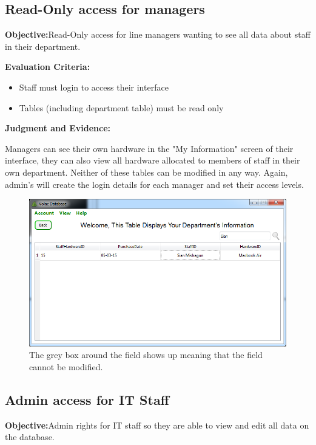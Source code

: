\subsection{Read-Only access for managers}

\textbf{Objective:}Read-Only access for line managers wanting to see all data about staff in their department.

\textbf{Evaluation Criteria:}
\begin{itemize}
\item{Staff must login to access their interface}
\item{Tables (including department table) must be read only}
\end{itemize}

\textbf{Judgment and Evidence:}

Managers can see their own hardware in the "My Information" screen of their interface, they can also view all hardware allocated to members of staff in their own department. Neither of these tables can be modified in any way. Again, admin's will create the login details for each manager and set their access levels.
\begin{figure}[H]
    \includegraphics[width=\textwidth]{./Evaluation/Images/readonlymanager.png}
    \caption{The grey box around the field shows up meaning that the field cannot be modified.} 
\end{figure}

\subsection{Admin access for IT Staff}\label{admin}

\textbf{Objective:}Admin rights for IT staff so they are able to view and edit all data on the database.

